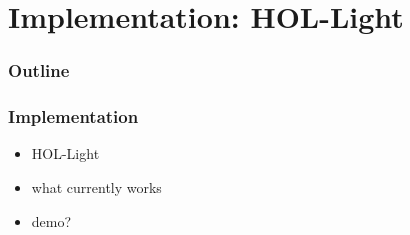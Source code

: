 \section{Implementation: HOL-Light}

\begin{frame}
\frametitle{Outline}

\tableofcontents[currentsection]
\end{frame}


\begin{frame}
\frametitle{Implementation}

\begin{itemize}
\item HOL-Light
\item what currently works
\item demo?
\end{itemize}

\end{frame}
